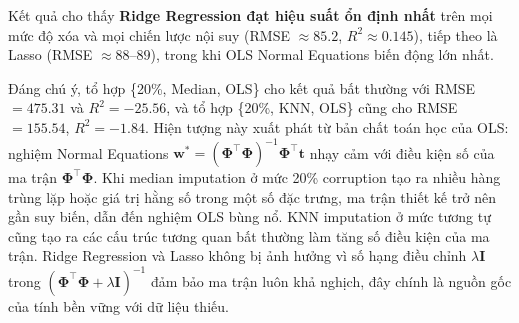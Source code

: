 \begin{table}[h]
\centering
\caption{RMSE và $R^2$ theo chiến lược nội suy và mức độ xóa dữ liệu (Regression).
Ô được đánh dấu ($\dagger$) biểu thị kết quả bất thường cần chú ý.}
\label{tab:corruption_reg}
\end{table}

Kết quả cho thấy \textbf{Ridge Regression đạt hiệu suất ổn định nhất}
trên mọi mức độ xóa và mọi chiến lược nội suy
(RMSE $\approx 85.2$, $R^2 \approx 0.145$), tiếp theo là Lasso
(RMSE $\approx 88$--$89$), trong khi OLS Normal Equations
biến động lớn nhất.

Đáng chú ý, tổ hợp \{20\%, Median, OLS\} cho kết quả bất thường
với RMSE $= 475.31$ và $R^2 = -25.56$, và tổ hợp \{20\%, KNN, OLS\}
cũng cho RMSE $= 155.54$, $R^2 = -1.84$.
Hiện tượng này xuất phát từ bản chất toán học của OLS:
nghiệm Normal Equations $\mathbf{w}^* = (\boldsymbol{\Phi}^\top\boldsymbol{\Phi})^{-1}\boldsymbol{\Phi}^\top\mathbf{t}$
nhạy cảm với điều kiện số của ma trận
$\boldsymbol{\Phi}^\top\boldsymbol{\Phi}$.
Khi median imputation ở mức 20\% corruption tạo ra nhiều hàng trùng lặp hoặc
giá trị hằng số trong một số đặc trưng, ma trận thiết kế trở nên
gần suy biến, dẫn đến nghiệm OLS bùng nổ.
KNN imputation ở mức tương tự cũng tạo ra các cấu trúc tương quan bất thường
làm tăng số điều kiện của ma trận.
Ridge Regression và Lasso không bị ảnh hưởng vì số hạng điều chỉnh
$\lambda\mathbf{I}$ trong $(\boldsymbol{\Phi}^\top\boldsymbol{\Phi} + \lambda\mathbf{I})^{-1}$
đảm bảo ma trận luôn khả nghịch, đây chính là nguồn gốc của
tính bền vững với dữ liệu thiếu.

